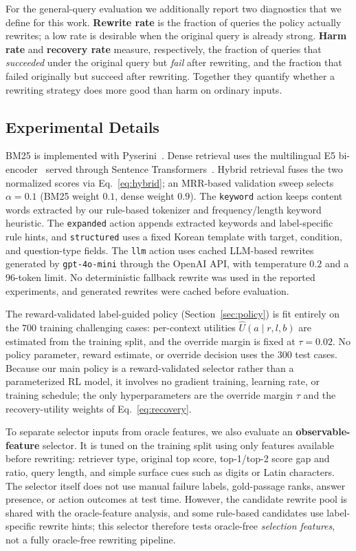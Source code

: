 \documentclass{article}
\begin{document}
For the general-query evaluation we additionally report two diagnostics that we
define for this work. \textbf{Rewrite rate} is the fraction of queries the policy
actually rewrites; a low rate is desirable when the original query is already
strong. \textbf{Harm rate} and \textbf{recovery rate} measure, respectively, the
fraction of queries that \emph{succeeded} under the original query but
\emph{fail} after rewriting, and the fraction that failed originally but succeed
after rewriting. Together they quantify whether a rewriting strategy does more
good than harm on ordinary inputs.

\subsection{Experimental Details}
\label{sec:expdetails}

BM25 is implemented with Pyserini~\cite{lin2021pyserini}. Dense retrieval uses
the multilingual E5 bi-encoder~\cite{wang2024me5} served through Sentence
Transformers~\cite{reimers2019sbert}. Hybrid retrieval fuses the two normalized
scores via Eq.~\eqref{eq:hybrid}; an MRR-based validation sweep selects
$\alpha = 0.1$ (BM25 weight $0.1$, dense weight $0.9$).
The \texttt{keyword} action keeps content words extracted by our rule-based
tokenizer and frequency/length keyword heuristic. The \texttt{expanded} action
appends extracted keywords and label-specific rule hints, and
\texttt{structured} uses a fixed Korean template with target, condition, and
question-type fields. The \texttt{llm} action uses cached LLM-based rewrites
generated by \texttt{gpt-4o-mini} through the OpenAI API, with temperature
$0.2$ and a $96$-token limit. No deterministic fallback rewrite was used in
the reported experiments, and generated rewrites were cached before
evaluation.

The reward-validated label-guided policy
(Section~\ref{sec:policy}) is fit entirely on the $700$ training challenging cases:
per-context utilities $\widehat{U}(a\mid r,l,b)$ are estimated from the training
split, and the override margin is fixed at $\tau = 0.02$. No policy parameter,
reward estimate, or override decision uses the $300$ test cases. Because our main
policy is a reward-validated selector rather than a parameterized RL model, it
involves no gradient training, learning rate, or training schedule; the only
hyperparameters are the override margin $\tau$ and the recovery-utility weights
of Eq.~\eqref{eq:recovery}.

To separate selector inputs from oracle features, we also evaluate an
\textbf{observable-feature} selector. It is tuned on the training split using
only features available before rewriting: retriever type, original top score,
top-1/top-2 score gap and ratio, query length, and simple surface cues such as
digits or Latin characters. The selector itself does not use manual failure
labels, gold-passage ranks, answer presence, or action outcomes at test time.
However, the candidate rewrite pool is shared with the oracle-feature analysis,
and some rule-based candidates use label-specific rewrite hints; this selector
therefore tests oracle-free \emph{selection features}, not a fully oracle-free
rewriting pipeline.
\end{document}

